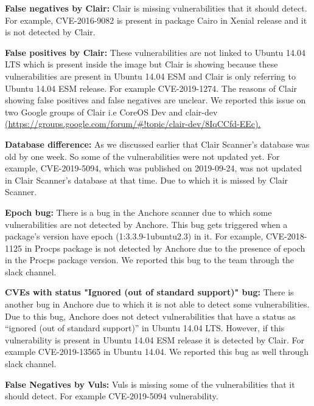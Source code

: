 \documentclass[a4paper,num-refs]{oup-contemporary}
\begin{document}
\textbf{False negatives by Clair:} Clair is missing vulnerabilities that it should detect. For example, CVE-2016-9082 
is present in package Cairo in Xenial release and it is not detected by Clair.

\textbf{False positives by Clair:} These vulnerabilities are not linked to Ubuntu 14.04 LTS which is 
present inside the image but Clair is showing because these vulnerabilities are present in Ubuntu 14.04 ESM and 
Clair is only referring to Ubuntu 14.04 ESM release. For example CVE-2019-1274. The reasons of Clair showing
false positives and false negatives are unclear. We reported this issue on two Google groups of Clair i.e CoreOS Dev and
clair-dev \href{https://groups.google.com/forum/\#!topic/clair-dev/8IqCCfd-EEc}{(https://groups.google.com/forum/\#!topic/clair-dev/8IqCCfd-EEc).}

\textbf{Database difference:} As we discussed earlier that Clair Scanner's database was old by one week.
                So some of the vulnerabilities were not updated yet. For example, CVE-2019-5094, which
		was published on 2019-09-24, was not 
		updated in Clair Scanner's database at that time. Due to which it is missed by Clair Scanner.


\textbf{Epoch bug:} There is a bug in the Anchore scanner due to which some vulnerabilities are 
		not detected by Anchore. This bug gets triggered when a package’s version have epoch 
		(1:3.3.9-1ubuntu2.3) in it. For example, CVE-2018-1125 in Procps package is not
		detected by Anchore due to the presence of epoch in the Procps package version.
		We reported this bug to the team through the slack channel.

\textbf{CVEs with status "Ignored (out of standard support)" bug:} There is another bug in Anchore due to 
		which it is not able to detect some vulnerabilities. Due to this bug, Anchore does not detect 
		vulnerabilities that have a status as “ignored (out of standard support)” in Ubuntu 14.04 LTS. 
		However, if this vulnerability is present in Ubuntu 14.04 ESM release it is detected by Clair. 
		For example CVE-2019-13565 in Ubuntu 14.04. We reported this bug as well through slack
		channel.


\textbf{False Negatives by Vuls:} Vuls is missing some of the vulnerabilities that it should detect. 
		For example CVE-2019-5094 vulnerability.
\end{document}
